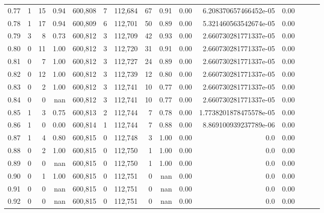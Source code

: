 \begin{tabular}{rrrrrrrrrrrrrrr}
0.77 &       1 &     15 &  0.94 &  600,808 &        7 &  112,684 &       67 &  0.91 &  0.00 &   6.208370657466452e-05 &      0.00 \\
0.78 &       1 &     17 &  0.94 &  600,809 &        6 &  112,701 &       50 &  0.89 &  0.00 &   5.321460563542674e-05 &      0.00 \\
0.79 &       3 &      8 &  0.73 &  600,812 &        3 &  112,709 &       42 &  0.93 &  0.00 &   2.660730281771337e-05 &      0.00 \\
0.80 &       0 &     11 &  1.00 &  600,812 &        3 &  112,720 &       31 &  0.91 &  0.00 &   2.660730281771337e-05 &      0.00 \\
0.81 &       0 &      7 &  1.00 &  600,812 &        3 &  112,727 &       24 &  0.89 &  0.00 &   2.660730281771337e-05 &      0.00 \\
0.82 &       0 &     12 &  1.00 &  600,812 &        3 &  112,739 &       12 &  0.80 &  0.00 &   2.660730281771337e-05 &      0.00 \\
0.83 &       0 &      2 &  1.00 &  600,812 &        3 &  112,741 &       10 &  0.77 &  0.00 &   2.660730281771337e-05 &      0.00 \\
0.84 &       0 &      0 &   nan &  600,812 &        3 &  112,741 &       10 &  0.77 &  0.00 &   2.660730281771337e-05 &      0.00 \\
0.85 &       1 &      3 &  0.75 &  600,813 &        2 &  112,744 &        7 &  0.78 &  0.00 &  1.7738201878475578e-05 &      0.00 \\
0.86 &       1 &      0 &  0.00 &  600,814 &        1 &  112,744 &        7 &  0.88 &  0.00 &   8.869100939237789e-06 &      0.00 \\
0.87 &       1 &      4 &  0.80 &  600,815 &        0 &  112,748 &        3 &  1.00 &  0.00 &                     0.0 &      0.00 \\
0.88 &       0 &      2 &  1.00 &  600,815 &        0 &  112,750 &        1 &  1.00 &  0.00 &                     0.0 &      0.00 \\
0.89 &       0 &      0 &   nan &  600,815 &        0 &  112,750 &        1 &  1.00 &  0.00 &                     0.0 &      0.00 \\
0.90 &       0 &      1 &  1.00 &  600,815 &        0 &  112,751 &        0 &   nan &  0.00 &                     0.0 &      0.00 \\
0.91 &       0 &      0 &   nan &  600,815 &        0 &  112,751 &        0 &   nan &  0.00 &                     0.0 &      0.00 \\
0.92 &       0 &      0 &   nan &  600,815 &        0 &  112,751 &        0 &   nan &  0.00 &                     0.0 &      0.00 \\

\end{tabular}
